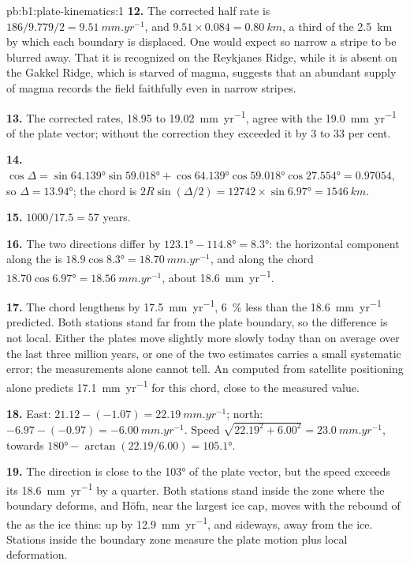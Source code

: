 \begin{solution}{pb:b1:plate-kinematics:1}
\textbf{12.} The corrected half rate is $186/9.779/2 = \qty{9.51}{mm.yr^{-1}}$,
and $9.51\times0.084 = \qty{0.80}{km}$, a third of the \qty{2.5}{km} by which
each boundary is displaced. One would expect so narrow a stripe to be blurred
away. That it is recognized on the Reykjanes Ridge, while it is absent on the
Gakkel Ridge, which is starved of magma, suggests that an abundant supply of
magma records the field faithfully even in narrow stripes.

\textbf{13.} The corrected rates, 18.95 to \qty{19.02}{mm.yr^{-1}}, agree with
the \qty{19.0}{mm.yr^{-1}} of the plate vector; without the correction they
exceeded it by 3 to 33 per cent.

\textbf{14.} $\cos\Delta = \sin\ang{64.139}\sin\ang{59.018} +
\cos\ang{64.139}\cos\ang{59.018}\cos\ang{27.554} = 0.97054$, so $\Delta =
\ang{13.94}$; the chord is $2R\sin(\Delta/2) = 12742\times\sin\ang{6.97} =
\qty{1546}{km}$.

\textbf{15.} $1000/17.5 = 57$ years.

\textbf{16.} The two directions differ by $\ang{123.1} - \ang{114.8} =
\ang{8.3}$: the horizontal component along the  is
$18.9\cos\ang{8.3} = \qty{18.70}{mm.yr^{-1}}$, and along the chord
$18.70\cos\ang{6.97} = \qty{18.56}{mm.yr^{-1}}$, about \qty{18.6}{mm.yr^{-1}}.

\textbf{17.} The chord lengthens by \qty{17.5}{mm.yr^{-1}}, \qty{6}{\percent}
less than the \qty{18.6}{mm.yr^{-1}} predicted. Both stations stand far from
the plate boundary, so the difference is not local. Either the plates move
slightly more slowly today than on average over the last three million years,
or one of the two estimates carries a small systematic error; the measurements
alone cannot tell. An  computed from satellite positioning alone
predicts \qty{17.1}{mm.yr^{-1}} for this chord, close to the measured value.

\textbf{18.} East: $21.12 - (-1.07) = \qty{22.19}{mm.yr^{-1}}$; north:
$-6.97 - (-0.97) = \qty{-6.00}{mm.yr^{-1}}$. Speed $\sqrt{22.19^2 + 6.00^2} =
\qty{23.0}{mm.yr^{-1}}$, towards $\ang{180} - \arctan(22.19/6.00) =
\ang{105.1}$.

\textbf{19.} The direction is close to the \ang{103} of the plate vector, but
the speed exceeds its \qty{18.6}{mm.yr^{-1}} by a quarter. Both stations stand
inside the zone where the boundary deforms, and Höfn, near the largest ice
cap, moves with the rebound of the  as the ice thins: up by
\qty{12.9}{mm.yr^{-1}}, and sideways, away from the ice. Stations
inside the boundary zone measure the plate motion plus local deformation.


\end{solution}
